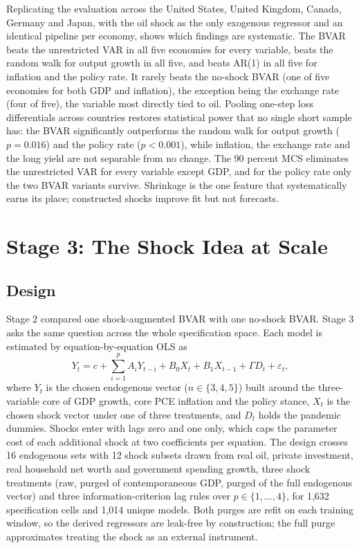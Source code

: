 \documentclass[conference]{IEEEtran}
\begin{document}
Replicating the evaluation across the United States, United Kingdom, Canada, Germany and Japan, with the oil shock as the only exogenous regressor and an identical pipeline per economy, shows which findings are systematic. The BVAR beats the unrestricted VAR in all five economies for every variable, beats the random walk for output growth in all five, and beats AR(1) in all five for inflation and the policy rate. It rarely beats the no-shock BVAR (one of five economies for both GDP and inflation), the exception being the exchange rate (four of five), the variable most directly tied to oil. Pooling one-step loss differentials across countries restores statistical power that no single short sample has: the BVAR significantly outperforms the random walk for output growth ($p=0.016$) and the policy rate ($p<0.001$), while inflation, the exchange rate and the long yield are not separable from no change. The 90 percent MCS eliminates the unrestricted VAR for every variable except GDP, and for the policy rate only the two BVAR variants survive. Shrinkage is the one feature that systematically earns its place; constructed shocks improve fit but not forecasts.

\section{Stage 3: The Shock Idea at Scale}

\subsection{Design}
Stage 2 compared one shock-augmented BVAR with one no-shock BVAR. Stage 3 asks the same question across the whole specification space. Each model is estimated by equation-by-equation OLS as
\begin{equation}
Y_t = c + \sum_{i=1}^{p} A_i Y_{t-i} + B_0 X_t + B_1 X_{t-1} + \Gamma D_t + \varepsilon_t,
\end{equation}
where $Y_t$ is the chosen endogenous vector ($n\in\{3,4,5\}$) built around the three-variable core of GDP growth, core PCE inflation and the policy stance, $X_t$ is the chosen shock vector under one of three treatments, and $D_t$ holds the pandemic dummies. Shocks enter with lags zero and one only, which caps the parameter cost of each additional shock at two coefficients per equation. The design crosses 16 endogenous sets with 12 shock subsets drawn from real oil, private investment, real household net worth and government spending growth, three shock treatments (raw, purged of contemporaneous GDP, purged of the full endogenous vector) and three information-criterion lag rules over $p\in\{1,\dots,4\}$, for 1,632 specification cells and 1,014 unique models. Both purges are refit on each training window, so the derived regressors are leak-free by construction; the full purge approximates treating the shock as an external instrument.
\end{document}
